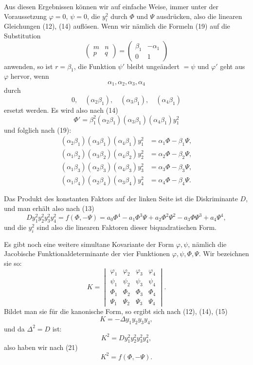 \documentclass[11pt]{article}
\begin{document}
Aus diesen Ergebnissen können wir auf einfache Weise, immer unter der Voraussetzung $\varphi=0$, $\psi=0$, die $y_i^2$ durch $\Phi$ und $\Psi$ ausdrücken, also die linearen Gleichungen (12), (14) auflösen. Wenn wir nämlich die Formeln (19) auf die Substitution
\[
\begin{pmatrix}m&n\\ p&q\end{pmatrix}
=
\begin{pmatrix}\beta_1&-\alpha_1\\ 0&1\end{pmatrix}
\]
anwenden, so ist $r=\beta_1$, die Funktion $\psi'$ bleibt ungeändert $=\psi$ und $\varphi'$ geht aus $\varphi$ hervor, wenn
\[
\alpha_1,\alpha_2,\alpha_3,\alpha_4
\]
durch
\[
0,\quad (\alpha_2\beta_1),\quad (\alpha_3\beta_1),\quad (\alpha_4\beta_1)
\]
ersetzt werden. Es wird also nach (14)
\[
\Phi'=\beta_1^2(\alpha_2\beta_1)(\alpha_3\beta_1)(\alpha_4\beta_1)y_1^2
\]
und folglich nach (19):
\begin{equation}
\begin{aligned}
(\alpha_2\beta_1)(\alpha_3\beta_1)(\alpha_4\beta_1)y_1^2&=\alpha_1\Phi-\beta_1\Psi,\\
(\alpha_1\beta_2)(\alpha_3\beta_2)(\alpha_4\beta_2)y_2^2&=\alpha_2\Phi-\beta_2\Psi,\\
(\alpha_1\beta_3)(\alpha_2\beta_3)(\alpha_4\beta_3)y_3^2&=\alpha_3\Phi-\beta_3\Psi,\\
(\alpha_1\beta_4)(\alpha_2\beta_4)(\alpha_3\beta_4)y_4^2&=\alpha_4\Phi-\beta_4\Psi.
\end{aligned}
\tag{20}
\end{equation}

Das Produkt des konstanten Faktors auf der linken Seite ist die Diskriminante $D$, und man erhält also nach (13)
\begin{equation}
D y_1^2y_2^2y_3^2y_4^2=f(\Phi,-\Psi)
=a_0\Phi^4-a_1\Phi^3\Psi+a_2\Phi^2\Psi^2-a_3\Phi\Psi^3+a_4\Psi^4,
\tag{21}
\end{equation}
und die $y_i^2$ sind also die linearen Faktoren dieser biquadratischen Form.

Es gibt noch eine weitere simultane Kovariante der Form $\varphi,\psi$, nämlich die Jacobische Funktionaldeterminante der vier Funktionen $\varphi,\psi,\Phi,\Psi$. Wir bezeichnen sie so:
\begin{equation}
K=
\begin{vmatrix}
\varphi_1&\varphi_2&\varphi_3&\varphi_4\\
\psi_1&\psi_2&\psi_3&\psi_4\\
\Phi_1&\Phi_2&\Phi_3&\Phi_4\\
\Psi_1&\Psi_2&\Psi_3&\Psi_4
\end{vmatrix}.
\tag{22}
\end{equation}
Bildet man sie für die kanonische Form, so ergibt sich nach (12), (14), (15)
\[
K=-\Delta y_1y_2y_3y_4,
\]
und da $\Delta^2=D$ ist:
\[
K^2=D y_1^2y_2^2y_3^2y_4^2,
\]
also haben wir nach (21)
\begin{equation}
K^2=f(\Phi,-\Psi).
\tag{23}
\end{equation}
\end{document}

